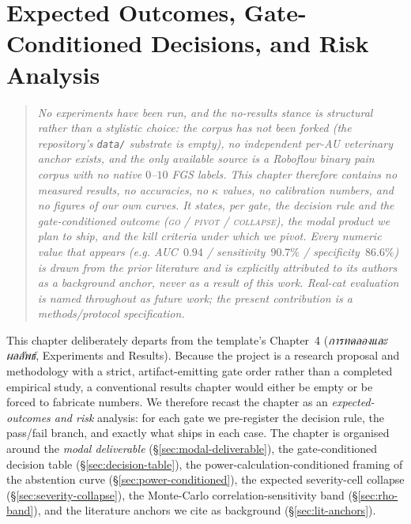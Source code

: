 %

\chapter{Expected Outcomes, Gate-Conditioned Decisions, and Risk Analysis}
\label{ch:expected-outcomes}

\newcommand{\evangelistanums}{AUC~$0.94$ / sensitivity~$90.7\%$ / specificity~$86.6\%$}

\begin{quote}\small\itshape
No experiments have been run, and the no-results stance is structural rather than a
stylistic choice: the corpus has not been forked (the repository's \texttt{data/}
substrate is empty), no independent per-AU veterinary anchor exists, and the only
available source is a Roboflow \emph{binary} pain corpus with no native $0$--$10$ FGS
labels. This chapter therefore contains no measured results, no accuracies, no
$\kappa$ values, no calibration numbers, and no figures of our own curves. It states,
per gate, the \emph{decision rule} and the gate-conditioned outcome
(\textsc{go} / \textsc{pivot} / \textsc{collapse}), the modal product we plan to ship,
and the kill criteria under which we pivot. Every numeric value that appears
(e.g. \evangelistanums) is drawn from the prior literature and is explicitly
attributed to its authors as a \emph{background anchor}, never as a result of this
work. Real-cat evaluation is named throughout as future work; the present
contribution is a methods/protocol specification.
\end{quote}

This chapter deliberately departs from the template's Chapter~4
(\emph{การทดลองและผลลัพธ์}, Experiments and Results). Because the project is a
research proposal and methodology with a strict, artifact-emitting gate order
rather than a completed empirical study, a conventional results chapter would
either be empty or be forced to fabricate numbers. We therefore recast the
chapter as an \emph{expected-outcomes and risk} analysis: for each gate we
pre-register the decision rule, the pass/fail branch, and exactly what ships in
each case. The chapter is organised around the \emph{modal deliverable}
(\S\ref{sec:modal-deliverable}), the gate-conditioned decision table
(\S\ref{sec:decision-table}), the power-calculation-conditioned framing of the
abstention curve (\S\ref{sec:power-conditioned}), the expected severity-cell
collapse (\S\ref{sec:severity-collapse}), the Monte-Carlo correlation-sensitivity
band (\S\ref{sec:rho-band}), and the literature anchors we cite as background
(\S\ref{sec:lit-anchors}).

